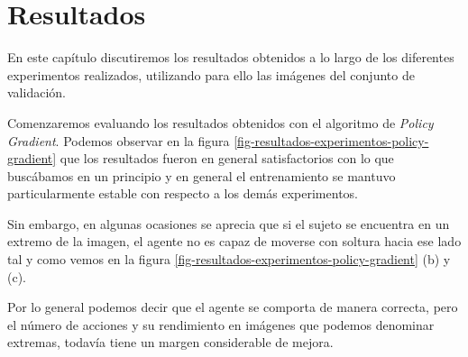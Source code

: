 \cleardoublepage

\chapter{Resultados}
\label{resultados}

En este capítulo discutiremos los resultados obtenidos a lo largo de los diferentes experimentos realizados, utilizando para ello las imágenes del conjunto de validación.
\medskip

Comenzaremos evaluando los resultados obtenidos con el algoritmo de \textit{Policy Gradient}. Podemos observar en la figura \ref{fig-resultados-experimentos-policy-gradient} que los resultados fueron en general satisfactorios con lo que buscábamos en un principio y en general el entrenamiento se mantuvo particularmente estable con respecto a los demás experimentos.
\medskip

Sin embargo, en algunas ocasiones se aprecia que si el sujeto se encuentra en un extremo de la imagen, el agente no es capaz de moverse con soltura hacia ese lado tal y como vemos en la figura \ref{fig-resultados-experimentos-policy-gradient} (b) y (c).
\medskip

Por lo general podemos decir que el agente se comporta de manera correcta, pero el número de acciones y su rendimiento en imágenes que podemos denominar extremas, todavía tiene un margen considerable de mejora.
\medskip

